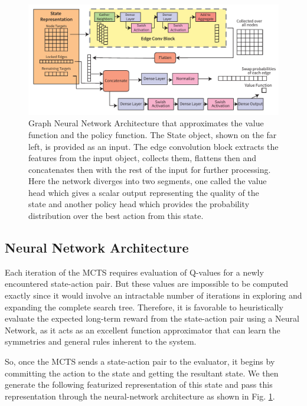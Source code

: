 \documentclass[%
 reprint,
amsmath,amssymb,showkeys,
pra,
]{revtex4-2}
\begin{document}
\begin{figure}[ht]
    \includegraphics[width=.96\textwidth]{images/Architecture.pdf}
    \caption{\label{fig:network-architecture}
        Graph Neural Network Architecture that approximates the value function and the policy function. The State object, shown on the far left, is provided as an input. The edge convolution block extracts the features from the input object, collects them, flattens then and concatenates then with the rest of the input for further processing. Here the network diverges into two segments, one called the value head which gives a scalar output representing the quality of the state and another policy head which provides the probability distribution over the best action from this state.}
\end{figure}

\subsection{\label{sec:method-model}Neural Network Architecture}

Each iteration of the MCTS requires evaluation of Q-values for a newly encountered state-action pair. But these values are impossible to be computed exactly since it would involve an intractable number of iterations in exploring and expanding the complete search tree. Therefore, it is favorable to heuristically evaluate the expected long-term reward from the state-action pair using a Neural Network, as it acts as an excellent function approximator that can learn the symmetries and general rules inherent to the system.

So, once the MCTS sends a state-action pair to the evaluator, it begins by committing the action to the state and getting the resultant state. We then generate the following featurized representation of this state and pass this representation through the neural-network architecture as shown in Fig. \ref{fig:network-architecture}.
\end{document}
